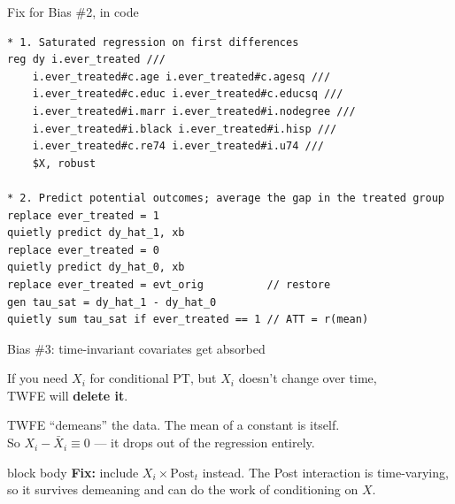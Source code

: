 \documentclass[aspectratio=169,11pt]{beamer}
\newcommand{\emphbox}[1]{%
  \begin{beamercolorbox}[rounded=true,sep=7pt,wd=\linewidth]{block body}%
    \small\color{slate} #1%
  \end{beamercolorbox}}
\begin{document}
\begin{frame}[fragile]{Fix for Bias \#2, in code}
\vspace{0.3em}
\begin{lstlisting}[language={[ANSI]C},basicstyle=\ttfamily\scriptsize]
* 1. Saturated regression on first differences
reg dy i.ever_treated ///
    i.ever_treated#c.age i.ever_treated#c.agesq ///
    i.ever_treated#c.educ i.ever_treated#c.educsq ///
    i.ever_treated#i.marr i.ever_treated#i.nodegree ///
    i.ever_treated#i.black i.ever_treated#i.hisp ///
    i.ever_treated#c.re74 i.ever_treated#i.u74 ///
    $X, robust

* 2. Predict potential outcomes; average the gap in the treated group
replace ever_treated = 1
quietly predict dy_hat_1, xb
replace ever_treated = 0
quietly predict dy_hat_0, xb
replace ever_treated = evt_orig          // restore
gen tau_sat = dy_hat_1 - dy_hat_0
quietly sum tau_sat if ever_treated == 1 // ATT = r(mean)
\end{lstlisting}
\end{frame}


\begin{frame}{Bias \#3: time-invariant covariates get absorbed}
\vspace{0.6em}
\begin{center}
If you need $X_i$ for conditional PT, but $X_i$ doesn't change over time,\\
TWFE will \textbf{delete it}.
\end{center}
\vspace{0.5em}
\begin{center}\color{warmgray}\small
TWFE ``demeans'' the data. The mean of a constant is itself.\\
So $X_i - \bar{X}_i \equiv 0$ --- it drops out of the regression entirely.
\end{center}
\vspace{0.5em}
\emphbox{\textbf{Fix:} include $X_i \times \mathrm{Post}_t$ instead. \;The Post interaction is time-varying,\\
so it survives demeaning and can do the work of conditioning on $X$.}
\end{frame}

\end{document}
